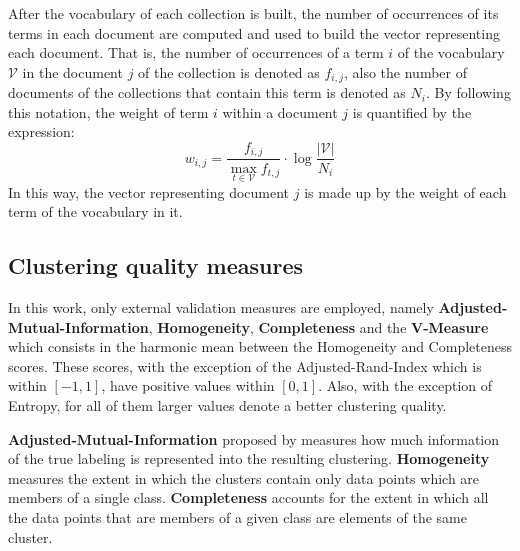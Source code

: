 \documentclass[a4paper]{article}
\begin{document}
After the vocabulary of each collection is built, the number of occurrences of its terms in each document are computed and used to build the vector representing each document. That is, the number of occurrences of a term $i$ of the  vocabulary $\mathcal{V}$ in the document $j$ of the collection is denoted as $f_{i,j}$, also the number of documents of the collections that contain this term is denoted as $N_{i}$. By following this notation, the weight of term $i$ within a document $j$ is quantified by the expression:\[w_{i,j}=\frac{f_{i,j}}{ \operatorname*{max}_{t\in \mathcal{V}}f_{t,j} }\cdot\log\frac{|\mathcal{V}|}{N_{i}}\] In this way, the vector representing document $j$ is made up by the weight of each term of the vocabulary in it.

\subsection*{Clustering quality measures}
In this work, only external validation measures are employed, namely \textbf{Adjusted-Mutual-Information}, \textbf{Homogeneity}, \textbf{Completeness} and the \textbf{V-Measure} which consists in the harmonic mean between the Homogeneity and Completeness scores. These scores, with the exception of  the Adjusted-Rand-Index which is within $[-1,1]$,  have positive values within $[0,1]$. Also, with the exception of Entropy, for all of them larger values denote a better clustering quality.

\textbf{Adjusted-Mutual-Information} proposed by \cite{VEB10} measures how much information of the true labeling is represented into the resulting clustering.
\textbf{Homogeneity} measures the extent in which the clusters contain only data points which are members of a single class. 
\textbf{Completeness} accounts for the extent in which all the data points that are members of a given class are elements of the same cluster.
\end{document}
